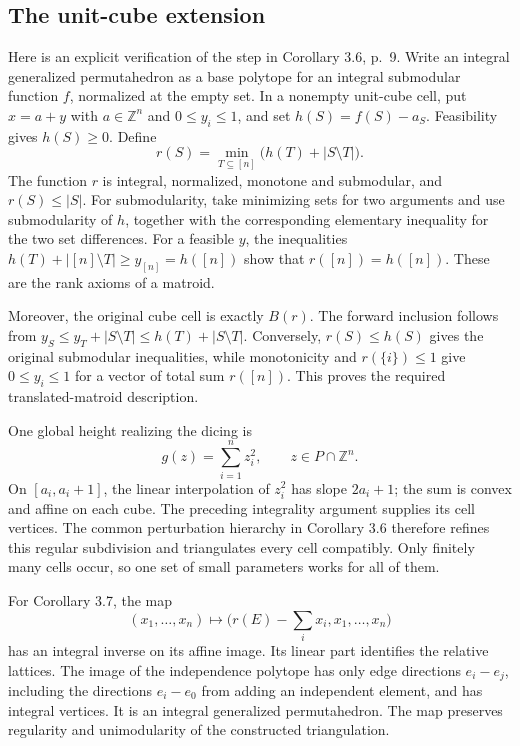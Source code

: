 \documentclass[10pt]{article}
\begin{document}
\subsection*{The unit-cube extension}
Here is an explicit verification of the step in Corollary 3.6, p. 9. Write an integral generalized permutahedron as a base polytope for an integral submodular function \(f\), normalized at the empty set. In a nonempty unit-cube cell, put \(x=a+y\) with \(a\in\mathbb Z^n\) and \(0\le y_i\le1\), and set \(h(S)=f(S)-a_S\). Feasibility gives \(h(S)\ge0\). Define \[r(S)=\min_{T\subseteq[n]}\bigl(h(T)+|S\setminus T|\bigr).\] The function \(r\) is integral, normalized, monotone and submodular, and \(r(S)\le |S|\). For submodularity, take minimizing sets for two arguments and use submodularity of \(h\), together with the corresponding elementary inequality for the two set differences. For a feasible \(y\), the inequalities \(h(T)+|[n]\setminus T|\ge y_{[n]}=h([n])\) show that \(r([n])=h([n])\). These are the rank axioms of a matroid.\par
Moreover, the original cube cell is exactly \(B(r)\). The forward inclusion follows from \(y_S\le y_T+|S\setminus T|\le h(T)+|S\setminus T|\). Conversely, \(r(S)\le h(S)\) gives the original submodular inequalities, while monotonicity and \(r(\{i\})\le1\) give \(0\le y_i\le1\) for a vector of total sum \(r([n])\). This proves the required translated-matroid description.\par
One global height realizing the dicing is \[g(z)=\sum_{i=1}^n z_i^2,\qquad z\in P\cap\mathbb Z^n.\] On \([a_i,a_i+1]\), the linear interpolation of \(z_i^2\) has slope \(2a_i+1\); the sum is convex and affine on each cube. The preceding integrality argument supplies its cell vertices. The common perturbation hierarchy in Corollary 3.6 therefore refines this regular subdivision and triangulates every cell compatibly. Only finitely many cells occur, so one set of small parameters works for all of them.\par
For Corollary 3.7, the map \[(x_1,\ldots,x_n)\longmapsto
 \bigl(r(E)-\textstyle\sum_i x_i,x_1,\ldots,x_n\bigr)\] has an integral inverse on its affine image. Its linear part identifies the relative lattices. The image of the independence polytope has only edge directions \(e_i-e_j\), including the directions \(e_i-e_0\) from adding an independent element, and has integral vertices. It is an integral generalized permutahedron. The map preserves regularity and unimodularity of the constructed triangulation.\par
\end{document}
